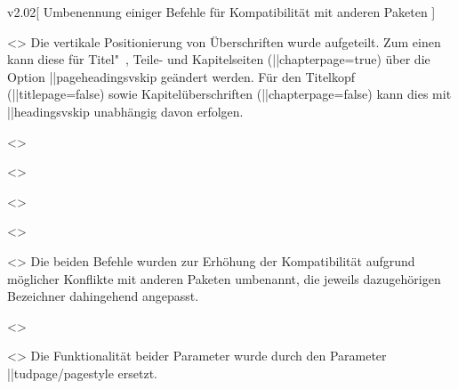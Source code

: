 \begin{Entity}{}
\begin{Changes}{v2.02}[%
  Umbenennung einiger Befehle für Kompatibilität mit anderen Paketen%
]
\begin{Obsolete}
  {}
  <>
\printdeclarationlist
%
Die vertikale Positionierung von Überschriften wurde aufgeteilt. Zum einen kann 
diese für Titel"~, Teile- und Kapitelseiten (\Option||{chapterpage=true}) über 
die Option \Option||{pageheadingsvskip} geändert werden. Für den Titelkopf
(\Option||{titlepage=false}) sowie Kapitelüberschriften 
(\Option||{chapterpage=false}) kann dies mit \Option||{headingsvskip} 
unabhängig davon erfolgen.
\end{Obsolete}

\begin{Obsolete}
  {}
  <>
\begin{Obsolete}
  {}
  <>
\begin{Obsolete}
  {}
  <>
\begin{Obsolete}
  {}
  <>
\begin{Obsolete}
  {}
  <>
\printdeclarationlist
%
Die beiden Befehle wurden zur Erhöhung der Kompatibilität aufgrund möglicher 
Konflikte mit anderen Paketen umbenannt, die jeweils dazugehörigen Bezeichner 
dahingehend angepasst.
\end{Obsolete}
\end{Obsolete}
\end{Obsolete}
\end{Obsolete}
\end{Obsolete}

\begin{Declaration*}
  {}
\begin{Obsolete}
  {}
  <>
\begin{Obsolete}
  {}
  <>
\printdeclarationlist
%
Die Funktionalität beider Parameter wurde durch den Parameter 
\Environment||{tudpage/pagestyle} ersetzt.
\end{Obsolete}
\end{Obsolete}
\end{Declaration*}




\end{Changes}
\end{Entity}
